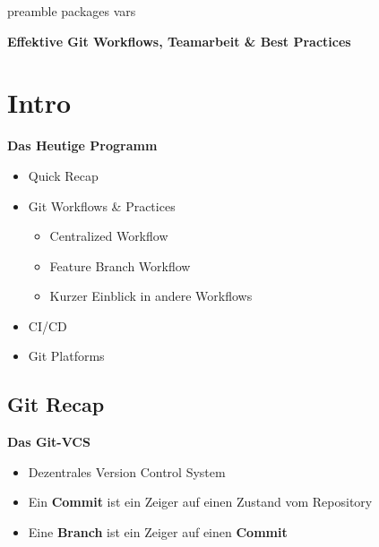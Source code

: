 \RequirePackage{import}
{preamble}
{packages}
{vars}

    \begin{frame}[c]
        \centering
        \Large
        \textbf{Effektive Git Workflows, Teamarbeit \& Best Practices}
    \end{frame}


    \section{Intro}\label{sec:intro}
    \begin{frame}[c]
        \slidehead
        \vspace{-1em}
        \centering
        \large
        \textbf{Das Heutige Programm}
        \vspace{1em}
        \begin{itemize}[<+->]
            \item Quick Recap
            \item Git Workflows \& Practices
            \begin{itemize}
                \item Centralized Workflow
                \item Feature Branch Workflow
                \item Kurzer Einblick in andere Workflows
            \end{itemize}
            \item CI/CD
            \item Git Platforms
        \end{itemize}
    \end{frame}

    \subsection{Git Recap}\label{subsec:git-recap}
    \begin{frame}[c]
        \slidehead
        \vspace{-1em}
        \centering
        \large
        \textbf{Das Git-VCS}
        \vspace{1em}
        \begin{itemize}[<+->]
            \item Dezentrales Version Control System
            \item Ein \textbf{Commit} ist ein Zeiger auf einen Zustand vom Repository
            \item Eine \textbf{Branch} ist ein Zeiger auf einen \textbf{Commit}
        \end{itemize}
    \end{frame}

